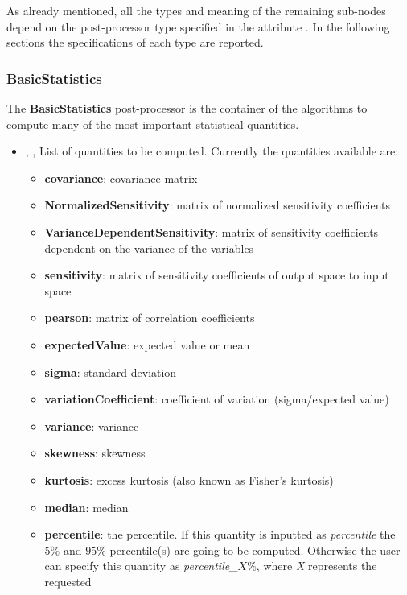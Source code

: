 As already mentioned, all the types and meaning of the remaining sub-nodes
depend on the post-processor type specified in the attribute .
%
In the following sections the specifications of each type are reported.

\subsubsection{BasicStatistics}
\label{BasicStatistics}
The \textbf{BasicStatistics} post-processor is the container of the algorithms
to compute many of the most important statistical quantities.
%
\begin{itemize}
  \item {}, ,
  List of quantities to be computed.
  Currently the quantities available are:
  \begin{itemize}
    \item \textbf{covariance}: covariance matrix
    \item \textbf{NormalizedSensitivity}: matrix of normalized sensitivity
    coefficients
    \item \textbf{VarianceDependentSensitivity}: matrix of sensitivity coefficients dependent on the variance of the variables
    \item \textbf{sensitivity}: matrix of sensitivity coefficients of output space to input space
    \item \textbf{pearson}: matrix of correlation coefficients
    \item \textbf{expectedValue}: expected value or mean
    \item \textbf{sigma}: standard deviation
    \item \textbf{variationCoefficient}: coefficient of variation
    (sigma/expected value)
    \item \textbf{variance}:  variance
    \item \textbf{skewness}: skewness
    \item \textbf{kurtosis}: excess kurtosis (also known as Fisher's kurtosis)
    \item \textbf{median}: median
    \item \textbf{percentile}: the percentile. If this quantity is inputted as \textit{percentile} the $5\%$ and $95\%$ percentile(s) are going to be computed. 
                               Otherwise the user can specify this quantity as \textit{percentile\_$X\%$}, where \textit{X} represents the requested 

\end{itemize}
\end{itemize}

